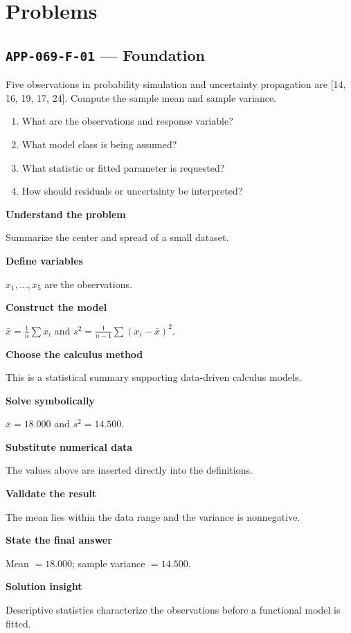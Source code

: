 \documentclass[11pt]{book}
\newcommand{\pid}[1]{\texttt{#1}}
\begin{document}
\section*{Problems}
\subsection*{\pid{APP-069-F-01} — Foundation}
\begin{problembox}
Five observations in probability simulation and uncertainty propagation are [14, 16, 19, 17, 24]. Compute the sample mean and sample variance.
\end{problembox}
\begin{promptbox}\begin{enumerate}
\item What are the observations and response variable?
\item What model class is being assumed?
\item What statistic or fitted parameter is requested?
\item How should residuals or uncertainty be interpreted?
\end{enumerate}\end{promptbox}
\begin{solutionbox}
\textbf{Understand the problem}\par Summarize the center and spread of a small dataset.\par\medskip
\textbf{Define variables}\par $x_1,\dots,x_5$ are the observations.\par\medskip
\textbf{Construct the model}\par $\bar x=\frac1n\sum x_i$ and $s^2=\frac1{n-1}\sum(x_i-\bar x)^2$.\par\medskip
\textbf{Choose the calculus method}\par This is a statistical summary supporting data-driven calculus models.\par\medskip
\textbf{Solve symbolically}\par $\bar x=18.000$ and $s^2=14.500$.\par\medskip
\textbf{Substitute numerical data}\par The values above are inserted directly into the definitions.\par\medskip
\textbf{Validate the result}\par The mean lies within the data range and the variance is nonnegative.\par\medskip
\textbf{State the final answer}\par Mean $=18.000$; sample variance $=14.500$.\par\medskip
\textbf{Solution insight}\par Descriptive statistics characterize the observations before a functional model is fitted.\par\medskip
\end{solutionbox}
\end{document}
